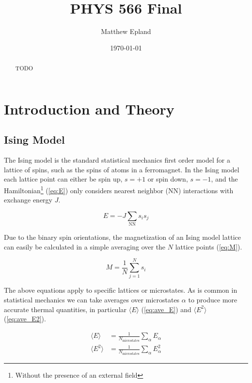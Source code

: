 \documentclass[notitlepage,aps,prd,nofootinbib]{revtex4-1}
\begin{document}
\title{PHYS 566 Final}
\author{Matthew Epland}

\date{\today}

\begin{abstract}
TODO
\end{abstract}\maketitle

\section{Introduction and Theory}
\label{sec:theory}
\subsection{Ising Model}
\label{subsec:ising}
The Ising model is the standard statistical mechanics first order model for a lattice of spins, such as the spins of atoms in a ferromagnet. In the Ising model each lattice point can either be spin up, $s=+1$ or spin down, $s=-1$, and the Hamiltonian\footnote{Without the presence of an external field} (\ref{eq:E}) only considers nearest neighbor (NN) interactions with exchange energy $J$.

\begin{equation}
\label{eq:E}
E = -J \sum_{\mathrm{NN}} s_{i} s_{j}
\end{equation}

Due to the binary spin orientations, the magnetization of an Ising model lattice can easily be calculated in a simple averaging over the $N$ lattice points (\ref{eq:M}).

\begin{equation}
\label{eq:M}
M = \frac{1}{N} \sum_{j=1}^{N} s_{i}
\end{equation}

The above equations apply to specific lattices or microstates. As is common in statistical mechanics we can take averages over microstates $\alpha$ to produce more accurate thermal quantities, in particular $\langle E \rangle$ (\ref{eq:ave_E}) and $\langle E^{2} \rangle$ (\ref{eq:ave_E2}).

\begin{align}
\langle E \rangle &= \frac{1}{N_{\mathrm{microstates}}} \sum_{\alpha} E_{\alpha} \label{eq:ave_E} \\
\langle E^{2} \rangle &= \frac{1}{N_{\mathrm{microstates}}} \sum_{\alpha} E_{\alpha}^{2} \label{eq:ave_E2}
\end{align}
\end{document}
